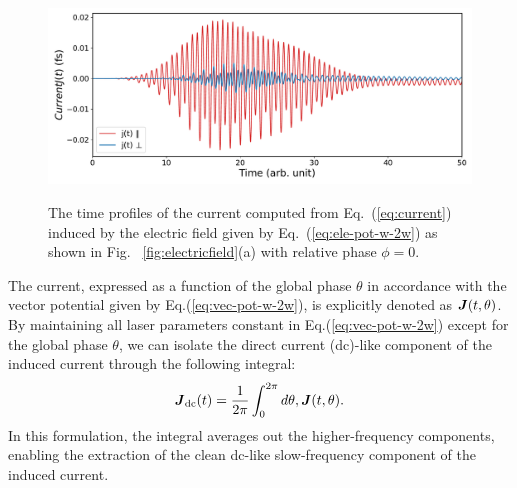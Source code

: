 \begin{figure}[htbp]
\centering
 \includegraphics[width=1.0\linewidth]{pic/initial_current.pdf}
\caption{\label{fig:initial_current}} 
The time profiles of the current computed from Eq.~(\ref{eq:current}) induced by the electric field given by Eq.~(\ref{eq:ele-pot-w-2w}) as shown in Fig. ~\ref{fig:electricfield}(a) with relative phase $\phi=0$. 
\end{figure}
The current, expressed as a function of the global phase $\theta$ in accordance with the vector potential given by Eq.(\ref{eq:vec-pot-w-2w}), is explicitly denoted as $\boldsymbol{J}(t,\theta)$. By maintaining all laser parameters constant in Eq.(\ref{eq:vec-pot-w-2w}) except for the global phase $\theta$, we can isolate the direct current (dc)-like component of the induced current through the following integral:
\begin{equation}
\boldsymbol{J}_{\text{dc}}(t) = \frac{1}{2\pi} \int_0^{2\pi} d\theta , \boldsymbol{J}(t,\theta).
\label{eq:dc-current}
\end{equation}
In this formulation, the integral averages out the higher-frequency components, enabling the extraction of the clean dc-like slow-frequency component of the induced current.
